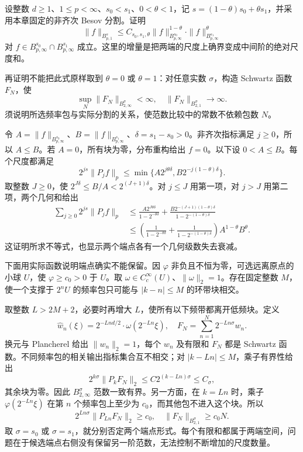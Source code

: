 \begin{optionalexercise}\label{b2:ex:19-new-8}
设整数 \(d\geq1\)、\(1\leq p<\infty\)、\(s_0<s_1\)、\(0<\theta<1\)，记 \(s=(1-\theta)s_0+\theta s_1\)，并采用本章固定的非齐次 Besov 分割。证明
\[
 \|f\|_{B^s_{p,1}}
 \leq C_{s_0,s_1,\theta}
       \|f\|_{B^{s_0}_{p,\infty}}^{1-\theta}
       \cdot\|f\|_{B^{s_1}_{p,\infty}}^\theta
\]
对 \(f\in B^{s_0}_{p,\infty}\cap B^{s_1}_{p,\infty}\) 成立。这里的增量是把两端的尺度上确界变成中间阶的绝对尺度和。

\ProseParagraphBreak

再证明不能把此式原样取到 \(\theta=0\) 或 \(\theta=1\)：对任意实数 \(\sigma\)，构造 Schwartz 函数 \(F_N\)，使
\[
 \sup_N\|F_N\|_{B^\sigma_{2,\infty}}<\infty,
 \quad \|F_N\|_{B^\sigma_{2,1}}\longrightarrow\infty.
\]
须说明所选频率包与实际分割的关系，使范数比较中的常数不依赖包数 \(N\)。
\end{optionalexercise}
\begin{solution}
令 \(A=\|f\|_{B^{s_0}_{p,\infty}}\)、\(B=\|f\|_{B^{s_1}_{p,\infty}}\)、\(\delta=s_1-s_0>0\)。非齐次指标满足 \(j\geq0\)，所以 \(A\leq B\)。若 \(A=0\)，所有块为零，分布重构给出 \(f=0\)。以下设 \(0<A\leq B\)。每个尺度都满足
\[
 2^{js}\|P_jf\|_p
 \leq\min\{A2^{j\theta\delta},
            B2^{-j(1-\theta)\delta}\}.
\]
取整数 \(J\geq0\)，使 \(2^{J\delta}\leq B/A<2^{(J+1)\delta}\)。对 \(j\leq J\) 用第一项，对 \(j>J\) 用第二项，两个几何和给出
\[
 \begin{aligned}
 \sum_{j\geq0}2^{js}\|P_jf\|_p
 &\leq\frac{A2^{J\theta\delta}}{1-2^{-\theta\delta}}
  +\frac{B2^{-(J+1)(1-\theta)\delta}}
         {1-2^{-(1-\theta)\delta}}\\
 &\leq\left(\frac1{1-2^{-\theta\delta}}
       +\frac1{1-2^{-(1-\theta)\delta}}\right)
       A^{1-\theta}B^\theta.
 \end{aligned}
\]
这证明所求不等式，也显示两个端点各有一个几何级数失去衰减。

下面用实际函数说明端点确实不能保留。因 \(\varphi\) 非负且不恒为零，可选远离原点的小球 \(U\)，使 \(\varphi\geq c_0>0\) 于 \(U\)。取 \(\omega\in C_c^\infty(U)\)、\(\|\omega\|_2=1\)。存在固定整数 \(M\)，使一个支撑于 \(2^nU\) 的频率包只可能与 \(|k-n|\leq M\) 的环带块相交。

取整数 \(L>2M+2\)，必要时再增大 \(L\)，使所有以下频带都离开低频块。定义
\[
 \widehat w_n(\xi)=2^{-Lnd/2}\cdot\omega(2^{-Ln}\xi),
 \quad
 F_N=\sum_{n=1}^N2^{-Ln\sigma}w_n.
\]
换元与 Plancherel 给出 \(\|w_n\|_2=1\)，每个 \(w_n\) 及有限和 \(F_N\) 都是 Schwartz 函数。不同频率包的相关输出指标集合互不相交；对 \(|k-Ln|\leq M\)，乘子有界性给出
\[
 2^{k\sigma}\|P_kF_N\|_2
 \leq C2^{(k-Ln)\sigma}\leq C_\sigma,
\]
其余块为零。因此 \(B^\sigma_{2,\infty}\) 范数一致有界。另一方面，在 \(k=Ln\) 时，乘子 \(\varphi(2^{-Ln}\xi)\) 在第 \(n\) 个频率包上至少为 \(c_0\)，而其他包不进入这个块。所以
\[
 2^{Ln\sigma}\|P_{Ln}F_N\|_2\geq c_0,
 \quad \|F_N\|_{B^\sigma_{2,1}}\geq c_0N.
\]
取 \(\sigma=s_0\) 或 \(\sigma=s_1\)，就分别否定两个端点形式。每个有限和都属于两端空间，问题在于候选端点右侧没有保留另一阶范数，无法控制不断增加的尺度数量。
\end{solution}
